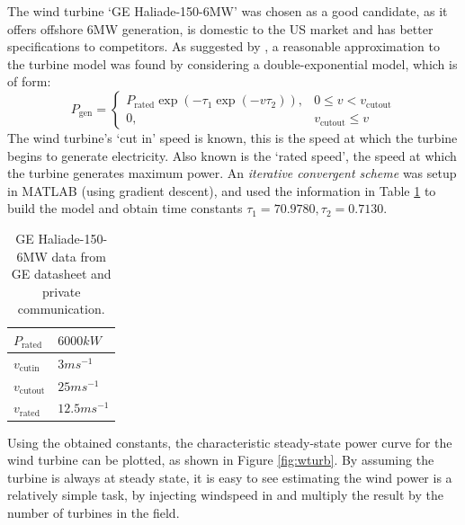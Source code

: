 The wind turbine `GE Haliade-150-6MW' was chosen as a good candidate, as it offers offshore 6MW generation, is domestic to the US market and has better specifications to competitors.
As suggested by \cite{power:wturbine}, a reasonable approximation to the turbine model was found by considering a double-exponential model, which is of form:
%
\begin{equation}
        \label{eqn:wturbexm}
        P_{\text{gen}} =
        \begin{cases}
                P_{\text{rated}} \exp ( -\tau_1 \exp (-v \tau_2)),& 0 \leq v < v_{\text{cutout}}\\
                0,& v_{\text{cutout}} \leq v
        \end{cases}
\end{equation}
The wind turbine's `cut in' speed is known, this is the speed at which the turbine begins to generate electricity.
Also known is the `rated speed', the speed at which the turbine generates maximum power.
An \emph{iterative convergent scheme} was setup in MATLAB (using gradient descent), and used the information in Table \ref{tbl:haliade} to build the model and obtain time constants $\tau_1 = 70.9780,\tau_2 = 0.7130$.
%
\begin{table}[bh]
        \centering
        \begin{tabular}{||l | l||}
                \hline
                $P_{\text{rated}}$ & $6000kW$\\
                \hline
                $v_{\text{cutin}}$ & $3ms^{-1}$\\
                \hline
                $v_{\text{cutout}}$ & $25ms^{-1}$\\
                \hline
                $v_{\text{rated}}$ & $12.5ms^{-1}$\\
                \hline
        \end{tabular}
        \caption{GE Haliade-150-6MW data from GE datasheet and private communication. \cite{power:wturbdata}} \label{tbl:haliade}
\end{table}

Using the obtained constants, the characteristic steady-state power curve for the wind turbine can be plotted, as shown in Figure \ref{fig:wturb}.
By assuming the turbine is always at steady state, it is easy to see estimating the wind power is a relatively simple task, by injecting windspeed in and multiply the result by the number of turbines in the field.

